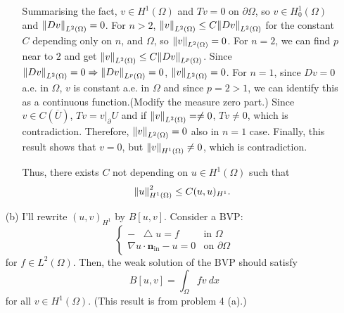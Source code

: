 \documentclass{article}
\newcommand*\Laplace{\mathop{}\!\mathbin\bigtriangleup}
\begin{document}
\begin{enumerate}
\begin{enumerate}
Summarising the fact, $v\in H^1(\Omega)$ and $Tv=0$ on $\partial \Omega$, so $v\in H^1_0(\Omega)$ and $\norm{Dv}_{L^2(\Omega)}=0$. For $n>2$, $\norm{v}_{L^2(\Omega)}\leq C\norm{Dv}_{L^2(\Omega)}$ for the constant $C$ depending only on $n$, and $\Omega$, so $\norm{v}_{L^2(\Omega)}=0$. For $n=2$, we can find $p$ near to $2$ and get $\norm{v}_{L^2(\Omega)}\leq C\norm{Dv}_{L^p(\Omega)}$. Since $\norm{Dv}_{L^2(\Omega)}=0\Rightarrow \norm{Dv}_{L^p(\Omega)}=0$, $\norm{v}_{L^2(\Omega)}=0$. For $n=1$, since $Dv=0$ a.e. in $\Omega$, $v$ is constant a.e. in $\Omega$ and since $p=2>1$, we can identify this as a continuous function.(Modify the measure zero part.) Since $v\in C(\overline{U})$, $Tv=v|_\partial{U}$ and if $\norm{v}_{L^2(\Omega)}=\neq 0$, $Tv\neq 0$, which is contradiction. Therefore, $\norm{v}_{L^2(\Omega)}=0$ also in $n=1$ case. Finally, this result shows that $v=0$, but $\norm{v}_{H^1(\Omega)}\neq 0$, which is contradiction.

Thus, there exists $C$ not depending on $u\in H^1(\Omega)$ such that
\begin{equation*}
\norm{u}^2_{H^1(\Omega)}\leq C(u,u)_{H^1}.
\end{equation*}
\end{enumerate}
\item[(b)] I'll rewrite $(u,v)_{H^1}$ by $B[u,v]$. Consider a BVP:
\begin{equation*}
\begin{cases}
-\Laplace u=f & \text{in }\Omega\\
\nabla u\cdot \bm{n}_{\text{in}}-u=0 & \text{on }\partial \Omega
\end{cases}
\end{equation*}
for $f\in L^2(\Omega)$. Then, the weak solution of the BVP should satisfy
\begin{equation*}
B[u,v]=\int_\Omega f v~dx
\end{equation*}
for all $v\in H^1(\Omega)$. (This result is from problem 4 (a).)


\end{enumerate}
\end{document}
